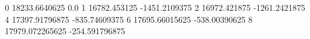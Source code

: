 0 18233.6640625 0.0
1 16782.453125 -1451.2109375
2 16972.421875 -1261.2421875
4 17397.91796875 -835.74609375
6 17695.66015625 -538.00390625
8 17979.072265625 -254.591796875
